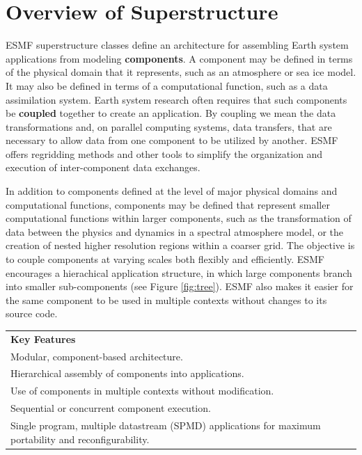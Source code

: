 %

\section{Overview of Superstructure}

ESMF superstructure classes define an architecture for assembling
Earth system applications from modeling {\bf components}.  A component
may be defined in terms of the physical domain that it represents,
such as an atmosphere or sea ice model.  It may also be defined in terms
of a computational function, such as a data assimilation system.
Earth system research often requires that such components be {\bf coupled} 
together to create an application.  By coupling we mean the data 
transformations and, on parallel computing systems, data transfers, 
that are necessary to allow data from one component to be utilized by 
another.  ESMF offers regridding methods and other tools to simplify 
the organization and execution of inter-component data exchanges.  

In addition to components defined at the level of major physical 
domains and computational functions, components may be defined that 
represent smaller computational functions within larger components, 
such as the transformation of data between the physics and dynamics 
in a spectral atmosphere model, 
or the creation of nested higher resolution regions 
within a coarser grid.  The objective is to couple components at varying 
scales both flexibly and efficiently.  ESMF encourages a hierachical
application structure, in which large components branch into 
smaller sub-components (see Figure \ref{fig:tree}).  ESMF also makes 
it easier for the same component to be used in multiple contexts 
without changes to its source code.

\begin{center}  
\begin{tabular}{|p{6in}|}
\hline
\vspace{.01in}
{\bf Key Features} \\[.01in]
Modular, component-based architecture. \\
Hierarchical assembly of components into applications.\\
Use of components in multiple contexts without modification.\\
Sequential or concurrent component execution.\\
Single program, multiple datastream (SPMD) applications for 
maximum portability and reconfigurability.\\[.03in] \hline
\end{tabular}
\end{center}

